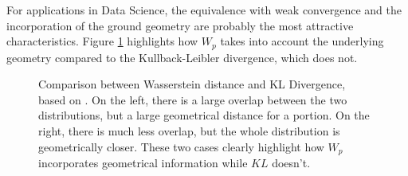 For applications in Data Science, the equivalence with weak convergence and the
incorporation of the ground geometry are probably the most attractive characteristics.
Figure \ref{fig:wl-kl}
highlights how $W_p$ takes into account the underlying geometry compared
to the Kullback-Leibler divergence, which does not.


\begin{figure}[H]
  \centering
  \def\svgscale{0.7}
  
	\caption{Comparison between Wasserstein distance and KL Divergence, based on \citet{montavon2016boltzmann}.
  On the left,
  there is a large overlap between the two distributions, but a large geometrical distance for a portion. On the right,
  there is much less overlap, but the whole distribution is geometrically closer. These two
  cases clearly highlight how $W_p$ incorporates geometrical information while $KL$ doesn't.}
	\label{fig:wl-kl}
\end{figure}
